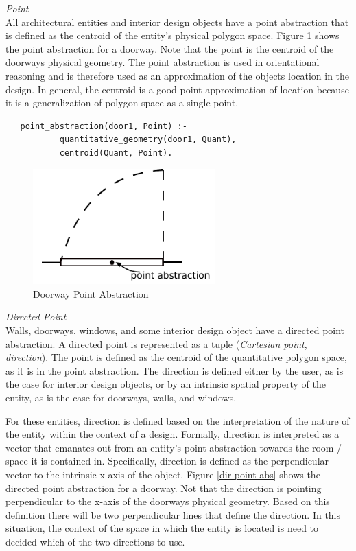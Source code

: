 \documentclass[12pt]{ucthesis}
\begin{document}
\noindent \emph{\large Point} \\
\indent All architectural entities and interior design objects have a point abstraction that is defined as the centroid of the entity's physical polygon space. Figure \ref{point-abs} shows the point abstraction for a doorway. Note that the point is the centroid of the doorways physical geometry. The point abstraction is used in orientational reasoning and is therefore used as an approximation of the objects location in the design. In general, the centroid is a good point approximation of location because it is a generalization of polygon space as a single point. 
\begin{verbatim}
   point_abstraction(door1, Point) :-
           quantitative_geometry(door1, Quant),
           centroid(Quant, Point).
\end{verbatim}

\begin{figure}[H]
\centering
\includegraphics[width=70mm]{point-abs}
\caption{Doorway Point Abstraction}
\label{point-abs}
\end{figure}

\noindent \emph{\large Directed Point} \\
\indent Walls, doorways, windows, and some interior design object have a directed point abstraction. A directed point is represented as a tuple (\emph{Cartesian point}, \emph{direction}). The point is defined as the centroid of the quantitative polygon space, as it is in the point abstraction. The direction is defined either by the user, as is the case for interior design objects, or by an intrinsic spatial property of the entity, as is the case for doorways, walls, and windows.

For these entities, direction is defined based on the interpretation of the nature of the entity within the context of a design. Formally, direction is interpreted as a vector that emanates out from an entity's point abstraction towards the room / space it is contained in. Specifically, direction is defined as the perpendicular vector to the intrinsic x-axis of the object. Figure \ref{dir-point-abs} shows the directed point abstraction for a doorway. Not that the direction is pointing perpendicular to the x-axis of the doorways physical geometry. Based on this definition there will be two perpendicular lines that define the direction. In this situation, the context of the space in which the entity is located is need to decided which of the two directions to use.  
\end{document}
